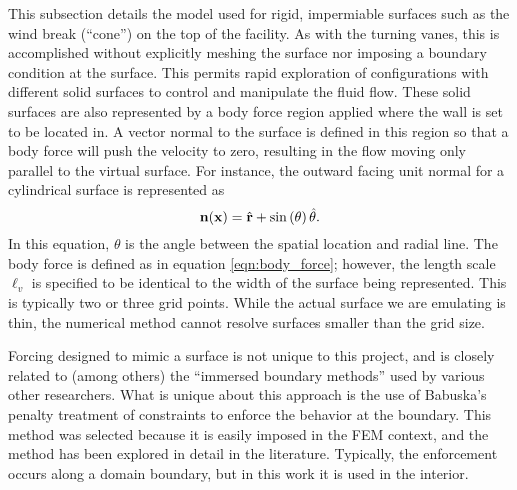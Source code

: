 This subsection details the model used for rigid, impermiable surfaces
such as the wind break (``cone'') on the top of the facility. As with
the turning vanes, this is accomplished without explicitly meshing the
surface nor imposing  a boundary condition at the surface. This permits
rapid exploration of configurations  with different solid surfaces to
control and manipulate the fluid flow. These solid surfaces are also
represented by a body force region applied where the wall is set to be
located in.  A vector normal to the surface is defined in this region so
that a body force will push  the velocity to zero, resulting in the flow
moving only parallel to the virtual surface. For instance, the outward
facing unit normal for a cylindrical surface is represented as 
\begin{equation}
 {\bf n}({\bf x}) = \hat{{\bf r}}+ \sin \left(\theta\right) \hat{{\bf \theta}}.
\end{equation}
In this equation, $\theta$ is the angle between the spatial location and
radial line. The body force is defined as in equation
\ref{eqn:body_force}; however, the length scale $\ell_v$ is specified to
be identical to the width  of the surface being represented. This is
typically two or three grid points. While the actual surface we are
emulating is thin, the numerical method cannot resolve surfaces smaller than the grid size. 

Forcing designed to mimic a surface
is not unique to this project, and is closely related to (among others)
the ``immersed boundary methods'' used by various other
researchers\cite{doi:10.1146/annurev.fluid.37.061903.175743}. What is
unique about this approach is the use of Babuska's penalty treatment of
constraints\cite{1973fempen,ZAMM:ZAMM19880680925} to enforce the
behavior at the boundary. This method was selected because it is easily
imposed in the FEM context, and the method has been explored in detail
in the literature. Typically, the enforcement occurs along a domain
boundary, but in this work it is used in the interior. 

